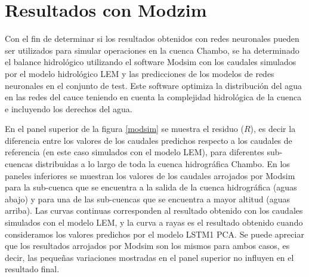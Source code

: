 \section{Resultados con Modzim}


Con el fin de determinar si los resultados obtenidos con redes neuronales pueden ser utilizados para simular 
operaciones en la cuenca Chambo, se ha determinado el balance hidrológico utilizando el software Modsim
con los caudales simulados por el modelo hidrológico LEM y las predicciones de los modelos
de redes neuronales en el conjunto de test. Este software optimiza la distribución del agua 
en las redes del cauce teniendo en cuenta la complejidad  hidrológica de la cuenca e incluyendo los derechos del agua.

En el panel superior de la figura \ref{modsim}  se muestra el residuo ($R$), es decir la diferencia entre los valores de los 
caudales predichos respecto a los caudales de referencia (en este caso simulados con el modelo LEM), 
para diferentes sub-cuencas distribuidas a lo largo de toda la cuenca hidrográfica Chambo. 
En los paneles inferiores se muestran los valores de los caudales  arrojados por Modsim  para la sub-cuenca que se encuentra
a la salida de la cuenca hidrográfica (aguas abajo) y para una de las sub-cuencas que se encuentra a mayor altitud (aguas arriba). 
Las curvas continuas corresponden al resultado obtenido con los caudales simulados con el modelo LEM, 
y la curva a rayas es el resultado obtenido cuando consideramos los valores predichos por el modelo LSTM1 PCA. 
Se puede apreciar que los resultados arrojados por Modsim son los mismos para ambos casos, es decir, 
las pequeñas variaciones mostradas en el panel superior no influyen en el resultado final. 



